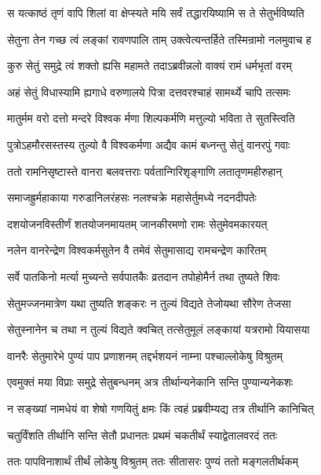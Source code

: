 \twolineshloka
{स यत्काष्ठं तृणं वापि शिलां वा क्षेप्स्यते मयि}
{सर्वं तद्धारयिष्यामि स ते सेतुर्भविष्यति}%

\twolineshloka
{सेतुना तेन गच्छ त्वं लङ्कां रावणपालि ताम्}
{उक्त्वेत्यन्तर्हिते तस्मिन्रामो नलमुवाच ह}%

\twolineshloka
{कुरु सेतुं समुद्रे त्वं शक्तो ह्यसि महामते}
{तदाऽब्रवीन्नलो वाक्यं रामं धर्मभृतां वरम्}%

\twolineshloka
{अहं सेतुं विधास्यामि ह्यगाधे वरुणालये}
{पित्रा दत्तवरश्चाहं सामर्थ्ये चापि तत्समः}%

\twolineshloka
{मातुर्मम वरो दत्तो मन्दरे विश्वक र्मणा}
{शिल्पकर्मणि मत्तुल्यो भविता ते सुतस्त्विति}%

\twolineshloka
{पुत्रोऽहमौरसस्तस्य तुल्यो वै विश्वकर्मणा}
{अद्यैव कामं बध्नन्तु सेतुं वानरपुं गवाः}%

\twolineshloka
{ततो रामनिसृष्टास्ते वानरा बलवत्तराः}
{पर्वतान्गिरिशृङ्गाणि लतातृणमहीरुहान्}%

\twolineshloka
{समाजह्रुर्महाकाया गरुडानिलरंहसः}
{नलश्चक्रे महासेर्तुमध्ये नदनदीपतेः}%

\twolineshloka
{दशयोजनविस्तीर्णं शतयोजनमायतम्}
{जानकीरमणो रामः सेतुमेवमकारयत्}%

\twolineshloka
{नलेन वानरेन्द्रेण विश्वकर्मसुतेन वै}
{तमेवं सेतुमासाद्य रामचन्द्रेण कारितम्}%

\twolineshloka
{सर्वे पातकिनो मर्त्या मुच्यन्ते सर्वपातकैः}
{व्रतदान तपोहोमैर्न तथा तुष्यते शिवः}%

\twolineshloka
{सेतुमज्जनमात्रेण यथा तुष्यति शङ्करः}
{न तुल्यं विद्यते तेजोयथा सौरेण तेजसा}%

\twolineshloka
{सेतुस्नानेन च तथा न तुल्यं विद्यते क्वचित्}
{तत्सेतुमूलं लङ्कायां यत्ररामो यियासया}%

\twolineshloka
{वानरैः सेतुमारेभे पुण्यं पाप प्रणाशनम्}
{तद्दर्भशयनं नाम्ना पश्चाल्लोकेषु विश्रुतम्}%

\twolineshloka
{एवमुक्तं मया विप्राः समुद्रे सेतुबन्धनम्}
{अत्र तीर्थान्यनेकानि सन्ति पुण्यान्यनेकशः}%

\twolineshloka
{न सङ्ख्यां नामधेयं वा शेषो गणयितुं क्षमः}
{किं त्वहं प्रब्रवीम्यद्य तत्र तीर्थानि कानिचित्}%

\twolineshloka
{चतुर्विंशति तीर्थानि सन्ति सेतौ प्रधानतः}
{प्रथमं चकतीर्थं स्याद्वेतालवरदं ततः}%

\twolineshloka
{ततः पापविनाशार्थं तीर्थं लोकेषु विश्रुतम्}
{ततः सीतासरः पुण्यं ततो मङ्गलतीर्थकम्}%


